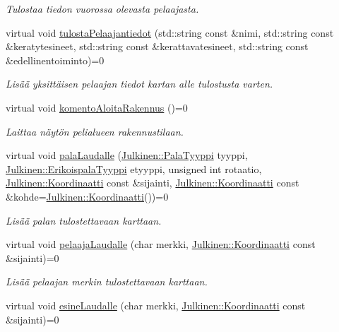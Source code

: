 \begin{DoxyCompactItemize}
\begin{DoxyCompactList}\small\item\em Tulostaa tiedon vuorossa olevasta pelaajasta. \end{DoxyCompactList}\item 
virtual void \hyperlink{class_julkinen_1_1_nayttorajapinta_a22bcc0e0dc309960ad11a8bf232a87a7}{tulosta\+Pelaajantiedot} (std\+::string const \&nimi, std\+::string const \&keratytesineet, std\+::string const \&kerattavatesineet, std\+::string const \&edellinentoiminto)=0
\begin{DoxyCompactList}\small\item\em Lisää yksittäisen pelaajan tiedot kartan alle tulostusta varten. \end{DoxyCompactList}\item 
virtual void \hyperlink{class_julkinen_1_1_nayttorajapinta_a1a3335dcbda7cf2fb09f5e9319c42cea}{komento\+Aloita\+Rakennus} ()=0
\begin{DoxyCompactList}\small\item\em Laittaa näytön pelialueen rakennustilaan. \end{DoxyCompactList}\item 
virtual void \hyperlink{class_julkinen_1_1_nayttorajapinta_aef4e3badfe7fa42dcfaba7bce4299301}{pala\+Laudalle} (\hyperlink{namespace_julkinen_a272c70e0503191a485c8a9cd4281e6f5}{Julkinen\+::\+Pala\+Tyyppi} tyyppi, \hyperlink{namespace_julkinen_afc26052e09d0b2214f749492cc5fff19}{Julkinen\+::\+Erikoispala\+Tyyppi} etyyppi, unsigned int rotaatio, \hyperlink{class_julkinen_1_1_koordinaatti}{Julkinen\+::\+Koordinaatti} const \&sijainti, \hyperlink{class_julkinen_1_1_koordinaatti}{Julkinen\+::\+Koordinaatti} const \&kohde=\hyperlink{class_julkinen_1_1_koordinaatti}{Julkinen\+::\+Koordinaatti}())=0
\begin{DoxyCompactList}\small\item\em Lisää palan tulostettavaan karttaan. \end{DoxyCompactList}\item 
virtual void \hyperlink{class_julkinen_1_1_nayttorajapinta_aa5db9bb4d55b723a2818fa0ec6ccd84a}{pelaaja\+Laudalle} (char merkki, \hyperlink{class_julkinen_1_1_koordinaatti}{Julkinen\+::\+Koordinaatti} const \&sijainti)=0
\begin{DoxyCompactList}\small\item\em Lisää pelaajan merkin tulostettavaan karttaan. \end{DoxyCompactList}\item 
virtual void \hyperlink{class_julkinen_1_1_nayttorajapinta_a64f3acc155ec834b7d8661fd7b85c50a}{esine\+Laudalle} (char merkki, \hyperlink{class_julkinen_1_1_koordinaatti}{Julkinen\+::\+Koordinaatti} const \&sijainti)=0

\end{DoxyCompactItemize}
